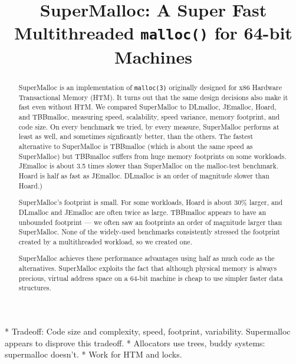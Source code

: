 \documentclass[pldi]{sigplanconf-pldi15}
\begin{document}
\title{SuperMalloc: A Super Fast Multithreaded \texttt{malloc()} for 64-bit Machines}
\date{}
\maketitle
\begin{abstract}
SuperMalloc is an implementation of \texttt{malloc(3)} originally
designed for x86 Hardware Transactional Memory (HTM)\@.  It turns out
that the same design decisions also make it fast even without HTM\@.
We compared SuperMalloc to DLmalloc, JEmalloc, Hoard, and TBBmalloc,
measuring speed, scalability, speed variance, memory footprint, and
code size.  On every benchmark we tried, by every measure, SuperMalloc
performs at least as well, and sometimes signficantly better, than the
others.  The fastest alternative to SuperMalloc is TBBmalloc (which is
about the same speed as SuperMalloc) but TBBmalloc suffers from huge
memory footprints on some workloads.  JEmalloc is about 3.5 times
slower than SuperMalloc on the malloc-test benchmark.  Hoard is half
as fast as JEmalloc. DLmalloc is an order of magnitude slower than
Hoard.)

SuperMalloc's footprint is small.  For some workloads, Hoard is about
30\% larger, and DLmalloc and JEmalloc are often twice as large.
TBBmalloc appears to have an unbounded footprint --- we often saw an
footprints an order of magnitude larger than SuperMalloc.  None of the
widely-used benchmarks consistently stressed the footprint created by
a multithreaded workload, so we created one.

SuperMalloc achieves these performance advantages using half as much
code as the alternatives.  SuperMalloc exploits the fact that although
physical memory is always precious, virtual address space on a 64-bit
machine is cheap to use simpler faster data structures.
\end{abstract}





* Tradeoff: Code size and complexity, speed, footprint, variability.  Supermalloc appears to disprove this tradeoff.
* Allocators use trees, buddy systems: supermalloc doesn't.
* Work for HTM and locks.
\end{document}
